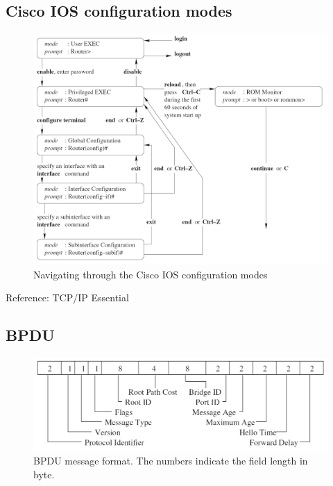 \documentclass[10pt,a4paper]{article}
\numberwithin{equation}{section}
\numberwithin{figure}{section}
\numberwithin{table}{section}
\begin{document}
\subsection{Cisco IOS configuration modes}
\begin{figure}[H]
    \centering
    \includegraphics[width=\textwidth]{img/appendix-ios.png}
    \caption{Navigating through the Cisco IOS configuration modes}
\end{figure}
Reference: TCP/IP Essential
\subsection{BPDU}
\begin{figure}[H]
    \centering
    \includegraphics[width=\textwidth]{img/bpdu.png}
    \caption{BPDU message format. The numbers indicate the field length in byte.}
\end{figure}
\end{document}
